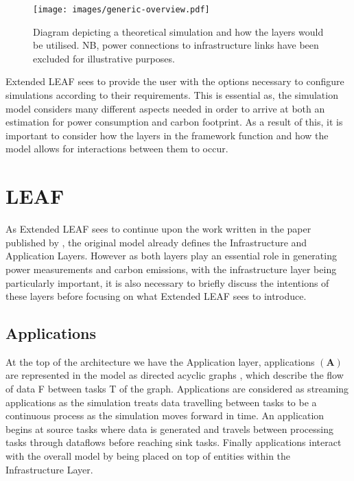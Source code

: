 \documentclass{l4proj}
\begin{document}
\begin{figure}[htbp]
    \centering
    \texttt{[image: images/generic-overview.pdf]}
    ~
    \caption{Diagram depicting a theoretical simulation and how the layers would be utilised. NB, power connections to infrastructure links have been excluded for illustrative purposes.}
    \label{fig:generic-overview}
\end{figure}

Extended LEAF sees to provide the user with the options necessary to configure simulations according to their requirements.
This is essential as, the simulation model considers many different aspects needed in order to arrive at both an estimation for power consumption and carbon footprint.
As a result of this, it is important to consider how the layers in the framework function and how the model allows for interactions between them to occur.

\section{LEAF}\label{sec:LEAF}
As Extended LEAF sees to continue upon the work written in the paper published by \cite{leaf2021}, the original model already defines the Infrastructure and Application Layers.
However as both layers play an essential role in generating power measurements and carbon emissions, with the infrastructure layer being particularly important, it is also necessary to briefly discuss the intentions of these layers before focusing on what Extended LEAF sees to introduce.

\subsection{Applications}\label{subsec:applications}
At the top of the architecture we have the Application layer, applications $\mathbf{(A)}$ are represented in the model as directed acyclic graphs \citep{leaf2021}, which describe the flow of data F between tasks T of the graph.
Applications are considered as streaming applications as the simulation treats data travelling between tasks to be a continuous process as the simulation moves forward in time.
An application begins at source tasks where data is generated and travels between processing tasks through dataflows before reaching sink tasks.
Finally applications interact with the overall model by being placed on top of entities within the Infrastructure Layer.
\end{document}

